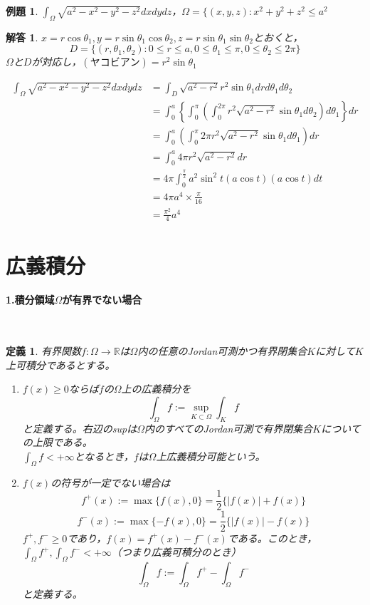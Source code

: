 \documentclass[dvipdfmx,a4j,10pt]{jsarticle}
\theoremstyle{mystyle1}
\newtheorem{dfn}{定義}[part]
\theoremstyle{mystyle2}
\newtheorem{ex}{例題}
\newtheorem{ans}{解答}
\begin{document}
\begin{ex}
	$\displaystyle \int_\Omega\sqrt{a^2-x^2-y^2-z^2}dxdydz$，$\Omega=\{(x,y,z):x^2+y^2+z^2\leq a^2$
\end{ex}

\begin{ans}
$x=r\cos\theta_1,y=r\sin\theta_1\cos\theta_2,z=r\sin\theta_1\sin\theta_2$とおくと，
\[
	D=\{(r,\theta_1,\theta_2):0\leq r\leq a,0\leq\theta_1\leq\pi,0\leq\theta_2\leq2\pi\}
\]
$\Omega$と$D$が対応し，$(ヤコビアン)=r^2\sin\theta_1$

\[
	\begin{split}
		\int_\Omega\sqrt{a^2-x^2-y^2-z^2}dxdydz
		&=\int_D\sqrt{a^2-r^2}r^2\sin\theta_1drd\theta_1d\theta_2 \\
		&=\int_0^a\left\{\int_0^\pi\left(\int_0^{2\pi}r^2\sqrt{a^2-r^2}\sin\theta_1d\theta_2\right)d\theta_1\right\}dr \\
		&=\int_0^a\left(\int_0^\pi 2\pi r^2\sqrt{a^2-r^2}\sin\theta_1d\theta_1\right)dr \\
		&=\int_0^a 4\pi r^2\sqrt{a^2-r^2}dr \\
		&= 4\pi\int_0^{\frac{\pi}{2}}a^2\sin^2 t(a\cos t)(a\cos t)dt\\
		&=4\pi a^4\times\frac{\pi}{16}\\
		&=\frac{\pi^2}{4}a^4
	\end{split}
\]
\end{ans}


\newpage


\section{広義積分}

\paragraph{1.積分領域$\Omega$が有界でない場合}
\
\begin{framed}
	\begin{dfn}\footnotemark
		有界関数$f:\Omega\to\mathbb{R}$は$\Omega$内の任意のJordan可測\footnotemark かつ有界閉集合$K$に対して$K$上可積分であるとする。
		\begin{enumerate}
			\item $f(x)\geq 0$ならば$f$の$\Omega$上の広義積分を
			\[
				\int_\Omega f := \sup_{K\subset\Omega}\int_K f
			\]
			と定義する。右辺のsupは$\Omega$内のすべてのJordan可測で有界閉集合$K$についての上限である。\\
			$\displaystyle\int_\Omega f<+\infty$となるとき，$f$は$\Omega$上広義積分可能という。
			\item $f(x)$の符号が一定でない場合は
			\[
			f^+(x):=\max\{f(x),0\}=\frac{1}{2}\{|f(x)|+f(x)\}
			\]
			\[
			f^-(x):=\max\{-f(x),0\}=\frac{1}{2}\{|f(x)|-f(x)\}
			\]
			$f^+,f^-\geq 0$であり，$f(x)=f^+(x)-f^-(x)$である。このとき，$\displaystyle\int_\Omega f^+,\int_\Omega f^- <+\infty$（つまり広義可積分のとき）
			\[
			\int_\Omega f := \int_\Omega f^+ - \int_\Omega f^-
			\]
			と定義する。
		\end{enumerate}
	\end{dfn}
\end{framed}
\end{document}
